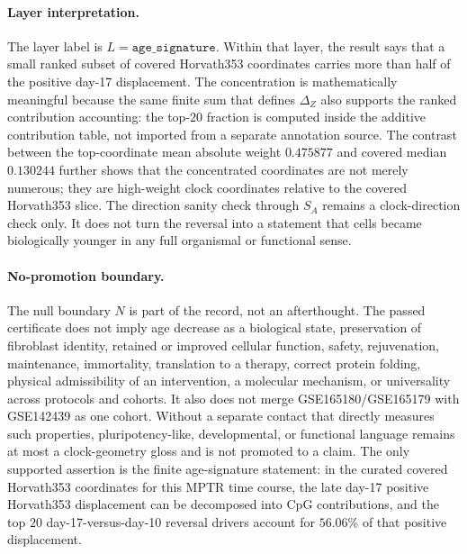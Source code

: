 \paragraph{Layer interpretation.}
The layer label is $L=\texttt{age\_signature}$. Within that layer, the result says that a small ranked subset of covered Horvath353 coordinates carries more than half of the positive day-17 displacement. The concentration is mathematically meaningful because the same finite sum that defines $\Delta_Z$ also supports the ranked contribution accounting: the top-$20$ fraction is computed inside the additive contribution table, not imported from a separate annotation source. The contrast between the top-coordinate mean absolute weight $0.475877$ and covered median $0.130244$ further shows that the concentrated coordinates are not merely numerous; they are high-weight clock coordinates relative to the covered Horvath353 slice. The direction sanity check through $S_A$ remains a clock-direction check only. It does not turn the reversal into a statement that cells became biologically younger in any full organismal or functional sense.

\paragraph{No-promotion boundary.}
The null boundary $N$ is part of the record, not an afterthought. The passed certificate does not imply age decrease as a biological state, preservation of fibroblast identity, retained or improved cellular function, safety, rejuvenation, maintenance, immortality, translation to a therapy, correct protein folding, physical admissibility of an intervention, a molecular mechanism, or universality across protocols and cohorts. It also does not merge GSE165180/GSE165179 with GSE142439 as one cohort. Without a separate contact that directly measures such properties, pluripotency-like, developmental, or functional language remains at most a clock-geometry gloss and is not promoted to a claim. The only supported assertion is the finite age-signature statement: in the curated covered Horvath353 coordinates for this MPTR time course, the late day-17 positive Horvath353 displacement can be decomposed into CpG contributions, and the top $20$ day-17-versus-day-10 reversal drivers account for $56.06\%$ of that positive displacement.
